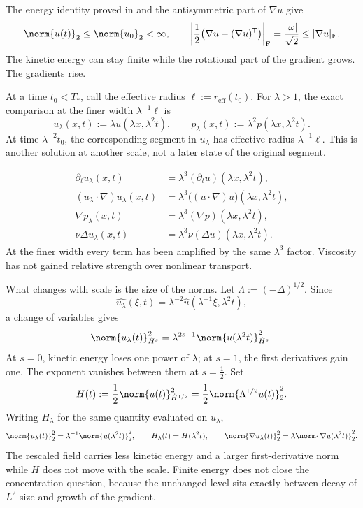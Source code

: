 The energy identity proved in  and the antisymmetric part of \(\nabla u\) give
\[
  \norm{u(t)}_2
  \leq
  \norm{u_0}_2
  <\infty,
  \qquad
  \left|\frac12\bigl(\nabla u-(\nabla u)^{\mathsf T}\bigr)\right|_{\mathrm F}
  =
  \frac{|\omega|}{\sqrt2}
  \leq
  |\nabla u|_{\mathrm F}.
\]
The kinetic energy can stay finite while the rotational part of the gradient grows. The gradients rise.


At a time \(t_0<T_*\), call the effective radius \(\ell:=r_{\mathrm{eff}}(t_0)\). For \(\lambda>1\), the exact \NavierStokes{} comparison at the finer width \(\lambda^{-1}\ell\) is
\[
  u_\lambda(x,t)
  :=
  \lambda u(\lambda x,\lambda^2t),
  \qquad
  p_\lambda(x,t)
  :=
  \lambda^2p(\lambda x,\lambda^2t).
\]
At time \(\lambda^{-2}t_0\), the corresponding segment in \(u_\lambda\) has effective radius \(\lambda^{-1}\ell\). This is another solution at another scale, not a later state of the original segment.

\[
\begin{aligned}
  \partial_tu_\lambda(x,t)
  &=
  \lambda^3(\partial_tu)(\lambda x,\lambda^2t),
  \\
  (u_\lambda\cdot\nabla)u_\lambda(x,t)
  &=
  \lambda^3\bigl((u\cdot\nabla)u\bigr)(\lambda x,\lambda^2t),
  \\
  \nabla p_\lambda(x,t)
  &=
  \lambda^3(\nabla p)(\lambda x,\lambda^2t),
  \\
  \nu\Delta u_\lambda(x,t)
  &=
  \lambda^3\nu(\Delta u)(\lambda x,\lambda^2t).
\end{aligned}
\]
At the finer width every term has been amplified by the same \(\lambda^3\) factor. Viscosity has not gained relative strength over nonlinear transport.


What changes with scale is the size of the norms. Let \(\Lambda:=(-\Delta)^{1/2}\). Since
\[
  \widehat{u_\lambda}(\xi,t)
  =
  \lambda^{-2}\widehat u(\lambda^{-1}\xi,\lambda^2t),
\]
a change of variables gives
\[
  \norm{u_\lambda(t)}_{\dot H^s}^2
  =
  \lambda^{2s-1}
  \norm{u(\lambda^2t)}_{\dot H^s}^2.
\]
At \(s=0\), kinetic energy loses one power of \(\lambda\); at \(s=1\), the first derivatives gain one. The exponent vanishes between them at \(s=\tfrac12\). Set
\[
  H(t)
  :=
  \frac12\norm{u(t)}_{\dot H^{1/2}}^2
  =
  \frac12\norm{\Lambda^{1/2}u(t)}_2^2.
\]
Writing \(H_\lambda\) for the same quantity evaluated on \(u_\lambda\),
\[
  \norm{u_\lambda(t)}_2^2
  =
  \lambda^{-1}\norm{u(\lambda^2t)}_2^2,
  \qquad
  H_\lambda(t)=H(\lambda^2t),
  \qquad
  \norm{\nabla u_\lambda(t)}_2^2
  =
  \lambda\norm{\nabla u(\lambda^2t)}_2^2.
\]
The rescaled field carries less kinetic energy and a larger first-derivative norm while \(H\) does not move with the scale. Finite energy does not close the concentration question, because the unchanged level sits exactly between decay of \(L^2\) size and growth of the gradient.

